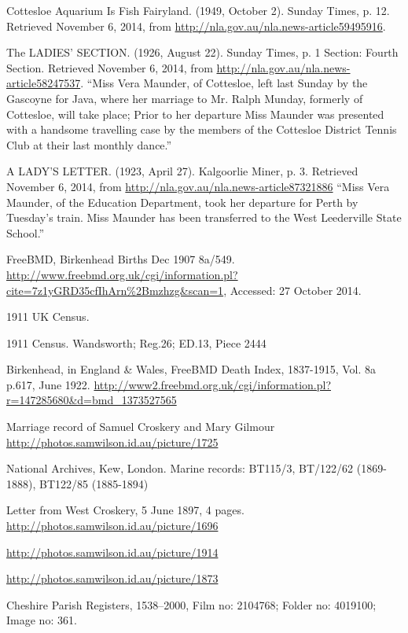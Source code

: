 \begin{thebibliography}{99}
    Cottesloe Aquarium Is Fish Fairyland.
    (1949, October 2). Sunday Times, p. 12. Retrieved November 6, 2014,
    from \url{http://nla.gov.au/nla.news-article59495916}.

	The LADIES' SECTION. (1926, August 22). Sunday Times, p. 1 Section: Fourth Section.
	Retrieved November 6, 2014, from \url{http://nla.gov.au/nla.news-article58247537}.
	``Miss Vera Maunder, of Cottesloe, left last Sunday by the Gascoyne for Java, where her marriage to Mr. Ralph Munday, formerly of Cottesloe, will take place; Prior to her departure Miss Maunder was presented with a handsome travelling case by the members of the Cottesloe District Tennis Club at their last monthly dance.''

	A LADY'S LETTER. (1923, April 27). Kalgoorlie Miner, p. 3.
	Retrieved November 6, 2014, from \url{http://nla.gov.au/nla.news-article87321886}
	``Miss Vera Maunder, of the Education Department, took her departure for Perth by Tuesday's train.
	Miss Maunder has been transferred to the West Leederville State School.''

	FreeBMD, Birkenhead Births Dec 1907 8a/549.
	\url{http://www.freebmd.org.uk/cgi/information.pl?cite=7z1yGRD35cfIhArn\%2Bmzhzg&scan=1}, Accessed: 27 October 2014.

	1911 UK Census.

	1911 Census. Wandsworth; Reg.26; ED.13, Piece 2444

	Birkenhead, in England \& Wales, FreeBMD Death Index, 1837-1915, Vol. 8a p.617, June 1922.
	\url{http://www2.freebmd.org.uk/cgi/information.pl?r=147285680&d=bmd_1373527565}

	Marriage record of Samuel Croskery and Mary Gilmour
	\url{http://photos.samwilson.id.au/picture/1725}

	National Archives, Kew, London.
	Marine records: BT115/3, BT/122/62 (1869-1888), BT122/85 (1885-1894)

	Letter from West Croskery, 5 June 1897, 4 pages.
	\url{http://photos.samwilson.id.au/picture/1696}

	\url{http://photos.samwilson.id.au/picture/1914}

	\url{http://photos.samwilson.id.au/picture/1873}

	Cheshire Parish Registers, 1538--2000, Film no: 2104768; Folder no: 4019100; Image no: 361.


\end{thebibliography}
